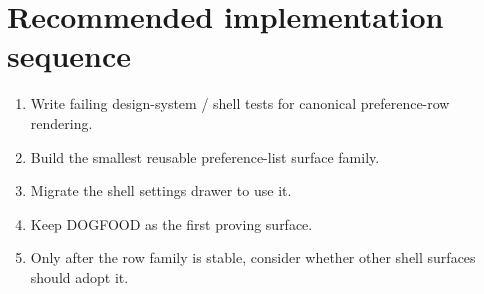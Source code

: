 \section{Recommended implementation sequence}\label{record-054-recommended-implementation-sequence}

\begin{enumerate}
\def\labelenumi{\arabic{enumi}.}
\tightlist
\item
  Write failing design-system / shell tests for canonical preference-row rendering.
\item
  Build the smallest reusable preference-list surface family.
\item
  Migrate the shell settings drawer to use it.
\item
  Keep DOGFOOD as the first proving surface.
\item
  Only after the row family is stable, consider whether other shell surfaces should adopt it.
\end{enumerate}

